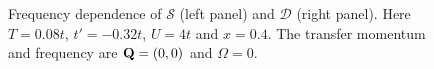 \begin{figure}[tbh]
  \caption{Frequency dependence of $\mathcal{S}$ (left panel) and $\mathcal{D}$ (right panel). Here $T=0.08t$, $t'=-0.32t$, $U=4t$ and $x=0.4$. The transfer momentum and frequency are $\mathbf{Q}=(0,0)$ and $\Omega=0$.}
  \label{fig:pairing}
\end{figure}




